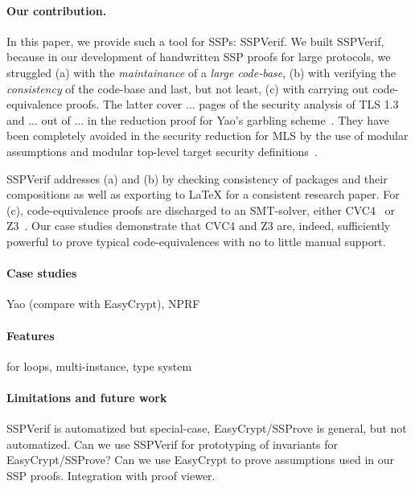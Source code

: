 \paragraph{Our contribution.} In this paper, we provide such a tool for SSPs: SSPVerif. 
We built SSPVerif, because in our development of handwritten SSP proofs for large protocols, we struggled (a) with the \emph{maintainance} of a \emph{large code-base}, (b) with verifying the \emph{consistency} of the code-base and last, but not least, (c) with carrying out code-equivalence proofs. The latter cover ... pages of the security analysis of TLS 1.3~\cite{X} and ... out of ... in the reduction proof for Yao's garbling scheme~\cite{X}. They have been completely avoided in the security reduction for MLS by the use of modular assumptions and modular top-level target security definitions~\cite{X}.

SSPVerif addresses (a) and (b) by checking consistency of packages and their compositions as well as exporting to LaTeX for a consistent research paper. For (c), code-equivalence proofs are discharged to an SMT-solver, either CVC4~\cite{X} or Z3~\cite{X}. Our case studies demonstrate that CVC4 and Z3 are, indeed, sufficiently powerful to prove typical code-equivalences with no to little manual support. 

\paragraph{Case studies}
Yao (compare with EasyCrypt), NPRF

\paragraph{Features}
for loops, multi-instance, type system

\paragraph{Limitations and future work}
SSPVerif is automatized but special-case, EasyCrypt/SSProve is general, but not automatized. Can we use SSPVerif for prototyping of invariants for EasyCrypt/SSProve? Can we use EasyCrypt to prove assumptions used in our SSP proofs. Integration with proof viewer.





